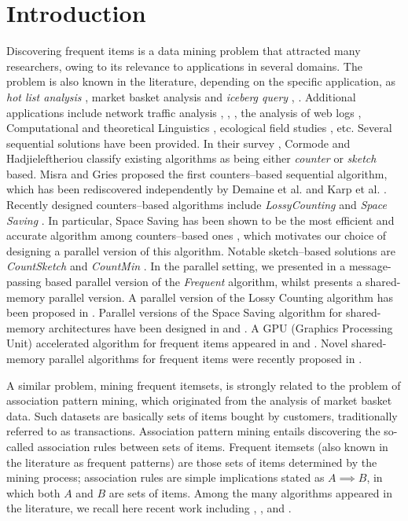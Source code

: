 \documentclass[final,3p,times]{elsarticle}
\begin{document}
\section{Introduction}
\label{intro}
Discovering frequent items is a  data mining problem that attracted many researchers, owing to its relevance to  applications in  several domains. The problem is also known in the literature, depending on the specific application, as \textit{hot list analysis} \cite{Gibbons}, market basket analysis \cite{Brin} and  \textit{iceberg query} \cite{Fang98computingiceberg}, \cite{Beyer99bottom-upcomputation}. Additional applications include network traffic analysis \cite{DemaineLM02},  \cite{Estan}, \cite{Pan}, the analysis of web logs \cite{Charikar}, Computational and theoretical Linguistics \cite{CICLing}, ecological field studies \cite{Mouillot}, etc.
Several sequential solutions have been provided. In their survey \cite{Cormode}, Cormode and Hadjieleftheriou classify existing algorithms as being either \emph{counter} or \emph{sketch} based. Misra and Gries \cite{Misra82} proposed the first counters--based sequential algorithm, which has been rediscovered independently by Demaine et al. \cite{DemaineLM02} and Karp et al. \cite{Karp}. Recently designed counters--based algorithms include \emph{LossyCounting}
\cite{Manku02approximatefrequency} and \emph{Space Saving} \cite{Metwally2006}. In particular, Space Saving has been shown to be the most efficient and accurate algorithm among counters--based ones \cite{Cormode}, which motivates our choice of designing a parallel version of this algorithm.
Notable sketch--based solutions are \emph{CountSketch} \cite{Charikar} and \emph{CountMin} \cite{Cormode05}. In the parallel setting, we presented in \cite{cafaro-tempesta} a message-passing based parallel version of the \emph{Frequent} algorithm, whilst \cite{Zhang2013} presents a shared-memory parallel version.  A parallel version of the Lossy Counting algorithm has been proposed in \cite{Zhang2012}. Parallel versions of the Space Saving algorithm for shared-memory architectures have been designed in \cite{Roy2012} and \cite{Das2009}. A GPU (Graphics Processing Unit) accelerated algorithm for frequent items appeared in \cite{Govindaraju2005} and \cite{Erra2012}. Novel shared-memory parallel algorithms for frequent items were recently proposed in \cite{Tangwongsan2014}.

A similar problem, mining frequent itemsets, is strongly related to the problem of association pattern mining, which originated from the analysis of market basket data. Such datasets are basically sets of items bought by customers, traditionally referred to as transactions. Association pattern mining entails discovering the so-called association rules between sets of items. Frequent itemsets (also known in the literature as frequent patterns) are those sets of items determined by the mining process; association rules are simple implications stated as $A \implies B$, in which both $A$ and $B$ are sets of items. Among the many algorithms appeared in the literature, we recall here recent work including \cite{fis1}, \cite{fis2}, \cite{fis3} and \cite{fis4}.
\end{document}
